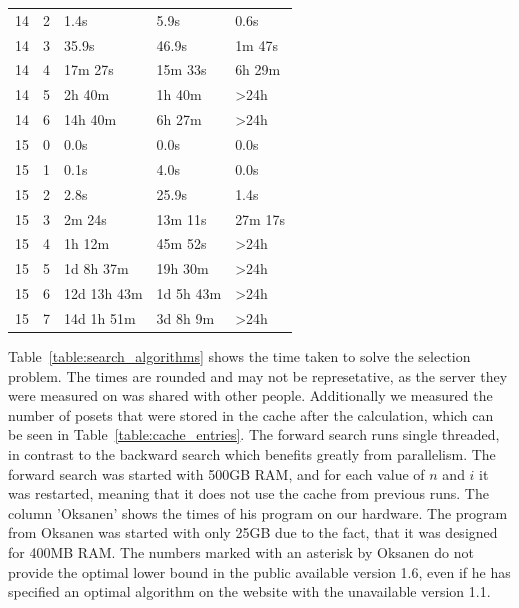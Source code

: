 \documentclass[10pt,journal,compsoc]{IEEEtran}
\begin{document}
\begin{table}[!t]
\begin{tabular}{c|c|l|l|l}
    14         & 2          & 1.4s                    & 5.9s                     & 0.6s             \\
    14         & 3          & 35.9s                   & 46.9s                    & 1m 47s           \\
    14         & 4          & 17m 27s                 & 15m 33s                  & 6h 29m           \\
    14         & 5          & 2h 40m                  & 1h 40m                   & >24h             \\
    14         & 6          & 14h 40m                 & 6h 27m                   & >24h             \\
    \hline
    15         & 0          & 0.0s                    & 0.0s                     & 0.0s             \\
    15         & 1          & 0.1s                    & 4.0s                     & 0.0s             \\
    15         & 2          & 2.8s                    & 25.9s                    & 1.4s             \\
    15         & 3          & 2m 24s                  & 13m 11s                  & 27m 17s          \\
    15         & 4          & 1h 12m                  & 45m 52s                  & >24h             \\
    15         & 5          & 1d 8h 37m               & 19h 30m                  & >24h             \\
    15         & 6          & 12d 13h 43m             & 1d 5h 43m                & >24h             \\
    15         & 7          & 14d 1h 51m              & 3d 8h 9m                 & >24h             \\
  \end{tabular}
\end{table}

Table~\ref{table:search_algorithms} shows the time taken to solve the selection problem.
The times are rounded and may not be represetative, as the server they were measured on was shared with other people.
Additionally we measured the number of posets that were stored in the cache after the calculation, which can be seen in Table~\ref{table:cache_entries}.
The forward search runs single threaded, in contrast to the backward search which benefits greatly from parallelism.
The forward search was started with 500GB RAM, and for each value of $n$ and $i$ it was restarted, meaning that it does not use the cache from previous runs.
The column 'Oksanen' shows the times of his program \cite{Oksanen} on our hardware.
The program from Oksanen was started with only 25GB due to the fact, that it was designed for 400MB RAM.
The numbers marked with an asterisk by Oksanen do not provide the optimal lower bound in the public available version 1.6, even if he has specified an optimal algorithm on the website with the unavailable version 1.1.
\end{document}
